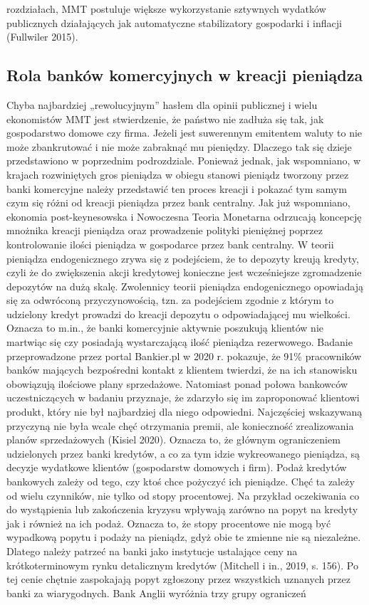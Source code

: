 \documentclass[
]{book}
\begin{document}
rozdziałach, MMT postuluje większe wykorzystanie sztywnych wydatków publicznych działających jak automatyczne stabilizatory gospodarki i inflacji (Fullwiler 2015).

\hypertarget{rola-bankuxf3w-komercyjnych-w-kreacji-pieniux105dza}{%
\subsection{Rola banków komercyjnych w kreacji pieniądza}\label{rola-bankuxf3w-komercyjnych-w-kreacji-pieniux105dza}}

Chyba najbardziej „rewolucyjnym'' hasłem dla opinii publicznej i wielu ekonomistów MMT jest stwierdzenie, że państwo nie zadłuża się tak, jak gospodarstwo domowe czy firma. Jeżeli jest suwerennym emitentem waluty to nie może zbankrutować i nie może zabraknąć mu pieniędzy. Dlaczego tak się dzieje przedstawiono w poprzednim podrozdziale. Ponieważ jednak, jak wspomniano, w krajach rozwiniętych gros pieniądza w obiegu stanowi pieniądz tworzony przez banki komercyjne należy przedstawić ten proces kreacji i pokazać tym samym czym się różni od kreacji pieniądza przez bank centralny. Jak już wspomniano, ekonomia post-keynesowska i Nowoczesna Teoria Monetarna odrzucają koncepcję mnożnika kreacji pieniądza oraz prowadzenie polityki pieniężnej poprzez kontrolowanie ilości pieniądza w gospodarce przez bank centralny. W teorii pieniądza endogenicznego zrywa się z podejściem, że to depozyty kreują kredyty, czyli że do zwiększenia akcji kredytowej konieczne jest wcześniejsze zgromadzenie depozytów na dużą skalę. Zwolennicy teorii pieniądza endogenicznego opowiadają się za odwróconą przyczynowością, tzn. za podejściem zgodnie z którym to udzielony kredyt prowadzi do kreacji depozytu o odpowiadającej mu wielkości. Oznacza to m.in., że banki komercyjnie aktywnie poszukują klientów nie martwiąc się czy posiadają wystarczającą ilość pieniądza rezerwowego. Badanie przeprowadzone przez portal Bankier.pl w 2020 r. pokazuje, że 91\% pracowników banków mających bezpośredni kontakt z klientem twierdzi, że na ich stanowisku obowiązują ilościowe plany sprzedażowe. Natomiast ponad połowa bankowców uczestniczących w badaniu przyznaje, że zdarzyło się im zaproponować klientowi produkt, który nie był najbardziej dla niego odpowiedni. Najczęściej wskazywaną przyczyną nie była wcale chęć otrzymania premii, ale konieczność zrealizowania planów sprzedażowych (Kisiel 2020). Oznacza to, że głównym ograniczeniem udzielonych przez banki kredytów, a co za tym idzie wykreowanego pieniądza, są decyzje wydatkowe klientów (gospodarstw domowych i firm). Podaż kredytów bankowych zależy od tego, czy ktoś chce pożyczyć ich pieniądze. Chęć ta zależy od wielu czynników, nie tylko od stopy procentowej. Na przykład oczekiwania co do wystąpienia lub zakończenia kryzysu wpływają zarówno na popyt na kredyty jak i również na ich podaż. Oznacza to, że stopy procentowe nie mogą być wypadkową popytu i podaży na pieniądz, gdyż obie te zmienne nie są niezależne. Dlatego należy patrzeć na banki jako instytucje ustalające ceny na krótkoterminowym rynku detalicznym kredytów (Mitchell i in., 2019, s. 156). Po tej cenie chętnie zaspokajają popyt zgłoszony przez wszystkich uznanych przez banki za wiarygodnych. Bank Anglii wyróżnia trzy grupy ograniczeń 
\end{document}
